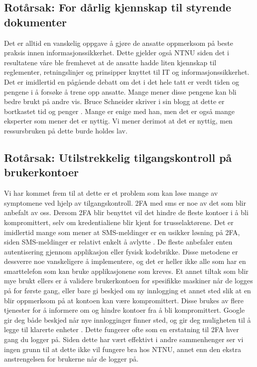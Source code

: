 \subsection*{Rotårsak: For dårlig kjennskap til styrende dokumenter}
Det er alltid en vanskelig oppgave å gjøre de ansatte oppmerksom på beste praksis innen informasjonssikkerhet. Dette gjelder også NTNU siden det i resultatene våre ble fremhevet at de ansatte hadde liten kjennskap til reglementer, retningslinjer og prinsipper knyttet til IT og informasjonssikkerhet. Det er imidlertid en pågående debatt om det i det hele tatt er verdt tiden og pengene i å forsøke å trene opp ansatte. Mange mener disse pengene kan bli bedre brukt på andre vis. Bruce Schneider skriver i sin blogg at dette er bortkastet tid og penger \cite{SecAware}. Mange er enige med han, men det er også mange eksperter som mener det er nyttig. Vi mener derimot at det er nyttig, men ressursbruken på dette burde holdes lav. 

\subsection*{Rotårsak: Utilstrekkelig tilgangskontroll på brukerkontoer}
Vi har kommet frem til at dette er et problem som kan løse mange av symptomene ved hjelp av tilgangskontroll. 2FA med sms er noe av det som blir anbefalt av oss. Dersom 2FA blir benyttet vil det hindre de fleste kontoer i å bli kompromittert, selv om kredentialiene blir kjent for trusselaktørene. Det er imidlertid mange som mener at SMS-meldinger er en usikker løsning på 2FA, siden SMS-meldinger er relativt enkelt å avlytte \cite{2FA}. De fleste anbefaler enten autentisering gjennom applikasjon eller fysisk kodebrikke. Disse metodene er dessverre noe vanskeligere å implementere, og det er heller ikke alle som har en smarttelefon som kan bruke applikasjonene som kreves. Et annet tiltak som blir mye brukt ellers er å validere brukerkontoen for spesifikke maskiner når de logges på for første gang, eller bare gi beskjed om ny innlogging et annet sted slik at en blir oppmerksom på at kontoen kan være kompromittert. Disse brukes av flere tjenester for å informere om og hindre kontoer fra å bli kompromittert. Google gir deg både beskjed når nye innlogginger finner sted, og gir deg muligheten til å legge til klarerte enheter \cite{trustcomp}. Dette fungerer ofte som en erstatning til 2FA hver gang du logger på. Siden dette har vært effektivt i andre sammenhenger ser vi ingen grunn til at dette ikke vil fungere bra hos NTNU, annet enn den ekstra anstrengelsen for brukerne når de logger på. 



